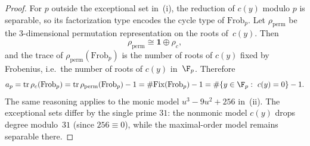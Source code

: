 \begin{proof}
For \(p\) outside the exceptional set in~(i), the reduction of \(c(y)\) modulo \(p\) is separable, so its factorization type encodes the cycle type of \(\mathrm{Frob}_p\). Let \(\rho_{\mathrm{perm}}\) be the \(3\)-dimensional permutation representation on the roots of~\(c(y)\). Then
\[
\rho_{\mathrm{perm}}\cong \mathbf{1}\oplus \rho_c,
\]
and the trace of \(\rho_{\mathrm{perm}}(\mathrm{Frob}_p)\) is the number of roots of \(c(y)\) fixed by Frobenius, i.e.\ the number of roots of \(c(y)\) in~\(\F_p\). Therefore
\[
a_p=\operatorname{tr}\rho_c(\mathrm{Frob}_p)=\operatorname{tr}\rho_{\mathrm{perm}}(\mathrm{Frob}_p)-1
=\#\mathrm{Fix}(\mathrm{Frob}_p)-1
=\#\{y\in \F_p:\ c(y)=0\}-1.
\]
The same reasoning applies to the monic model \(u^3-9u^2+256\) in~(ii). The exceptional sets differ by the single prime \(31\): the nonmonic model \(c(y)\) drops degree modulo~\(31\) (since \(256\equiv 0\)), while the maximal-order model remains separable there.
\end{proof}
